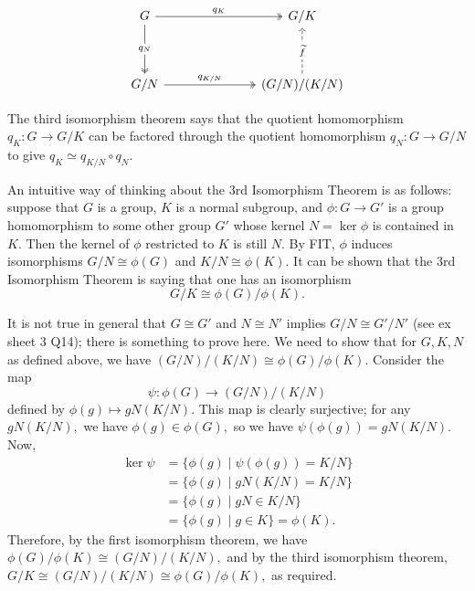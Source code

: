 \[\begin{tikzcd}
	G &&& {G/K} \\
	\\
	{G/N} &&& {(G/N)/(K/N)}
	\arrow["{q_{N}}"{description}, two heads, from=1-1, to=3-1]
	\arrow["{q_{K/N}}", two heads, from=3-1, to=3-4]
	\arrow["{\widetilde{f}}"{description}, dashed, from=3-4, to=1-4]
	\arrow["{q_{K}}", two heads, from=1-1, to=1-4]
\end{tikzcd}\]

\begin{remark}
 The third isomorphism theorem says that the quotient homomorphism $q_K : G \rightarrow G/K$ can be factored through the quotient homomorphism $q_N : G \rightarrow G/N$ to give $q_K \simeq q_{K/N} \circ q_N$.
\end{remark}

    

An intuitive way of thinking about the 3rd Isomorphism Theorem is as follows: suppose that $G$ is a group, $K$ is a normal subgroup, and $\phi: G \rightarrow G'$ is a group homomorphism to some other group $G'$ whose kernel $N = \ker \phi$ is contained in $K$. Then the kernel of $\phi$ restricted to $K$ is still $N$. By FIT, $\phi$ induces isomorphisms $G/N \cong \phi(G)$ and $K/N \cong \phi(K)$.
It can be shown that the 3rd Isomorphism Theorem is saying that one has an isomorphism 
$$
{G/K}\cong{\phi(G)/\phi(K)}. 
$$

It is not true in general that $G\cong G'$ and $N \cong N'$ implies $G/N \cong G'/N'$ (see ex sheet 3 Q14); there is something to prove here.
We need to show that for $G,K,N$ as defined above, we have $(G/N)/(K/N)\cong \phi(G)/\phi(K).$ 
Consider the map
$$\psi : \phi(G)\to (G/N)/(K/N)$$ defined by $\phi(g)\mapsto gN(K/N).$ This map is clearly surjective; for any $gN(K/N),$ we have $\phi(g) \in \phi(G),$ so we have $\psi(\phi(g))=gN(K/N).$ Now, 
\begin{align*}
    \ker{\psi}&=\{\phi(g)\mid \psi(\phi(g))=K/N\}
    \\ & =\{\phi(g)\mid gN(K/N)=K/N\}
    \\ & =\{\phi(g)\mid gN\in K/N\}
    \\ & =\{\phi(g)\mid g\in K\} = \phi(K).
\end{align*}
Therefore, by the first isomorphism theorem, we have $\phi(G)/\phi(K) \cong (G/N)/(K/N),$ and by the third isomorphism theorem, $G/K \cong (G/N)/(K/N) \cong \phi(G)/\phi(K),$ as required.


